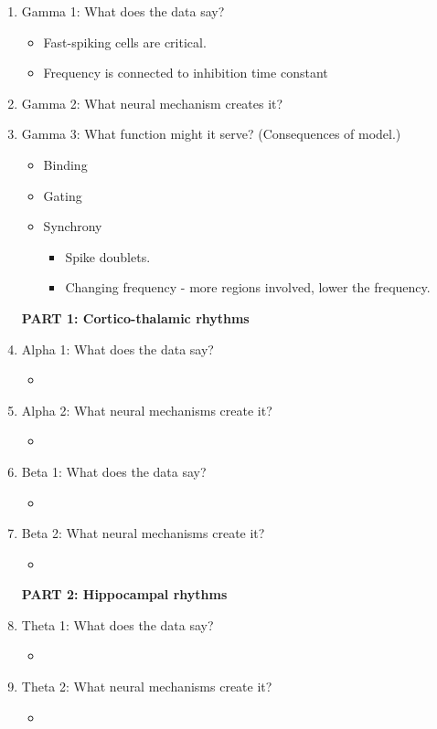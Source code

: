 \documentclass[11pt, reqno]{amsart}
\numberwithin{figure}{section}
\numberwithin{equation}{section}
\begin{document}
\begin{enumerate}
\item Gamma 1: What does the data say?
	\begin{itemize}
	\item Fast-spiking cells are critical.
	\item Frequency is connected to inhibition time constant
	\end{itemize}
\item Gamma 2: What neural mechanism creates it?
\item Gamma 3: What function might it serve? (Consequences of model.)
	\begin{itemize}
	\item Binding
	\item Gating
	\item Synchrony
		\begin{itemize}
		\item Spike doublets.
		\item Changing frequency - more regions involved, lower the frequency.
		\end{itemize}
	\end{itemize}

\textbf{PART 1: Cortico-thalamic rhythms}

\item Alpha 1: What does the data say?
\begin{itemize}
\item 
\end{itemize}
\item Alpha 2:  What neural mechanisms create it?
\begin{itemize}
\item 
\end{itemize}
\item Beta 1: What does the data say?
\begin{itemize}
\item 
\end{itemize}
\item Beta 2: What neural mechanisms create it?
\begin{itemize}
\item 
\end{itemize}

\textbf{PART 2: Hippocampal rhythms}

\item Theta 1: What does the data say?
\begin{itemize}
\item 
\end{itemize}
\item Theta 2: What neural mechanisms create it?
\begin{itemize}
\item 
\end{itemize}


\end{enumerate}
\end{document}
